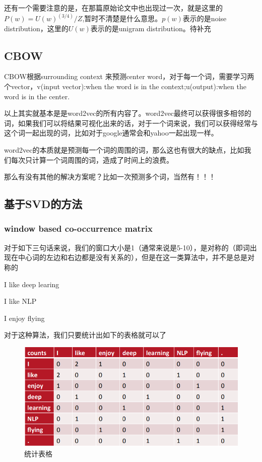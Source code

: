 	还有一个需要注意的是，在那篇原始论文中也出现过一次，就是这里的$P(w)=U(w)^(3/4)/Z$,暂时不清楚是什么意思。$p(w)$表示的是noise distribution，这里的$U(w)$表示的是unigram distribution。待补充
	

	
	\subsection{CBOW}
	CBOW根据surrounding context 来预测center word，对于每一个词，需要学习两个vector，v(input vector):when the word is in the context;u(output):when the word is in the center.
	
	以上其实就基本是是word2vec的所有内容了。word2vec最终可以获得很多相邻的词，如果我们可以将结果可视化出来的话，对于一个词来说，我们可以获得经常与这个词一起出现的词，比如对于google通常会和yahoo一起出现一样。
	
	word2vec的本质就是预测每一个词的周围的词，那么这也有很大的缺点，比如我们每次只计算一个词周围的词，造成了时间上的浪费。
	
	那么有没有其他的解决方案呢？比如一次预测多个词，当然有！！！
	
	
	\subsection{基于SVD的方法}
	
	\subsubsection{window based co-occurrence matrix}
	
	对于如下三句话来说，我们的窗口大小是1（通常来说是5-10），是对称的（即词出现在中心词的左边和右边都是没有关系的），但是在这一类算法中，并不是总是对称的
	
	I like deep learing
	
	I like NLP
	
	I enjoy flying
	
	
	对于这种算法，我们只要统计出如下的表格就可以了
	
	\begin{figure}[!htbp]
	\centering\includegraphics[width=6.5in]{img/6-9.png}
	\caption{统计表格}\label{fig:6-9}
	\end{figure}
	
